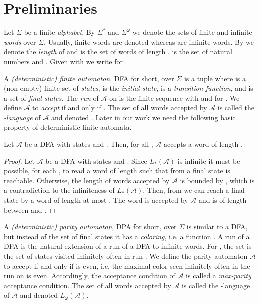 \documentclass[fleqn,envcountsame]{LMCS}
\newcommand{\aut}[1]{\ensuremath{\mathcal{#1}}}
\newcommand{\LsA}{\ensuremath{L_*(\aut{A})}\xspace}
\newcommand{\LoA}{\ensuremath{L_{\omega}(\aut{A})}\xspace}
\renewcommand{\S}{\ensuremath{\Sigma}\xspace}
\newcommand{\Sst}{\ensuremath{\Sigma^*}\xspace}
\newcommand{\Som}{\ensuremath{\Sigma^{\omega}}\xspace}
\newcommand{\ie}{i.e.\xspace}
\begin{document}
\section{Preliminaries}\label{sec:preliminaries}
Let \S be a finite \emph{alphabet}.
By \Sst and \Som we denote the sets of finite and infinite \emph{words} over \S.
Usually, finite words are denoted  whereas  are infinite words.
By  we denote the \emph{length} of  and
 is the set of words of length .
 is the set of natural numbers and .
Given  with 
we write  for .

A \emph{(deterministic) finite automaton}, DFA for short, over \S is a tuple
 where  is a (non-empty) finite set of
\emph{states},  is the \emph{initial state}, 
is a \emph{transition function}, and  is a set of
\emph{final states}. The \emph{run}  of \aut{A} on 
is the finite sequence  with  and
 for . We define
\aut{A} to \emph{accept}  if and only if . The
set of all words accepted by \aut{A} is called the
\emph{-language} of \aut{A} and denoted . Later in
our work we need the following basic property of deterministic
finite automata.

\begin{lem}\label{lem:length}
Let \aut{A} be a DFA with  states and . Then, for all
, \aut{A} accepts a word  of length .
\end{lem}

\begin{proof}
Let \aut{A} be a DFA with  states and . Since \LsA
is infinite it must be possible, for each , to read a word
 of length  such that from  a final state is
reachable. Otherwise, the length of words accepted by \aut{A} is
bounded by , which is a contradiction to the infiniteness of
\LsA. Then, from  we can reach a final state by a
word  of length at most . The word  is accepted by \aut{A}
and is of length between  and .
\end{proof}

A \emph{(deterministic) parity automaton}, DPA for short,
over \S is similar to a DFA, but instead of the set  of final
states it has a \emph{coloring}, \ie a function .
A run of a DPA is the natural extension of a run of a DFA to infinite words.
For , the set  is
the set of states visited infinitely often in run .
We define the parity automaton \aut{A} to accept  if and only if
 is even, \ie the maximal color seen
infinitely often in the run on  is even. Accordingly, the
acceptance condition of \aut{A} is called a \emph{max-parity}
acceptance condition. The set of all words accepted by \aut{A} is
called the -language of \aut{A} and denoted \LoA.
\end{document}
